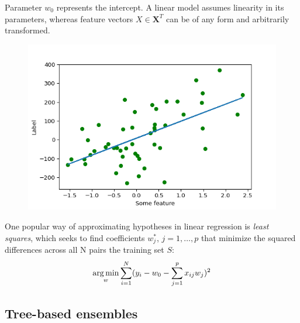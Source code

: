 Parameter $ w_0 $ represents the intercept. A linear model assumes linearity in its parameters, whereas feature vectors $ X \in \textbf{X}^{T} $ can be of any form and arbitrarily transformed. 

\begin{figure}
	\centering
	\includegraphics[width=0.7\linewidth]{../Implementation/Plots/linear_reg_example.png}
	\caption{}
	\label{fig:linearreg}
\end{figure}
One popular way of approximating hypotheses in linear regression is \textit{least squares}, which seeks to find coefficients $ w^{*}_j $, $ j = 1, \dots, p $ that minimize the squared differences across all N pairs the training set $ S $:
\begin{equation}
\operatorname*{arg\,min}_{w} \sum_{i=1}^{N}(y_i - w_0 - \sum_{j=1}^{p} x_{ij}w_j)^2 
\end{equation}

\subsection{Tree-based ensembles}

